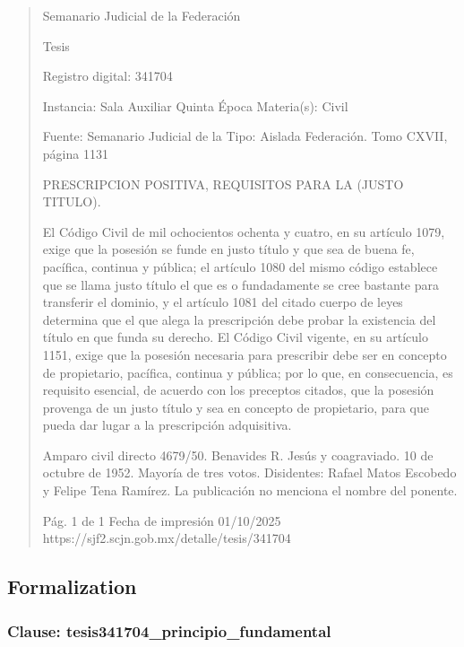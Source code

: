\documentclass[11pt,a4paper]{article}
\begin{document}
\begin{quote}
                                                   Semanario Judicial de la Federación

                                                  Tesis

 Registro digital: 341704

 Instancia: Sala Auxiliar         Quinta Época                         Materia(s): Civil

                                  Fuente: Semanario Judicial de la     Tipo: Aislada
                                  Federación.
                                  Tomo CXVII, página 1131


PRESCRIPCION POSITIVA, REQUISITOS PARA LA (JUSTO TITULO).


El Código Civil de mil ochocientos ochenta y cuatro, en su artículo 1079, exige que la posesión se
funde en justo título y que sea de buena fe, pacífica, continua y pública; el artículo 1080 del mismo
código establece que se llama justo título el que es o fundadamente se cree bastante para transferir
el dominio, y el artículo 1081 del citado cuerpo de leyes determina que el que alega la prescripción
debe probar la existencia del título en que funda su derecho. El Código Civil vigente, en su artículo
1151, exige que la posesión necesaria para prescribir debe ser en concepto de propietario, pacífica,
continua y pública; por lo que, en consecuencia, es requisito esencial, de acuerdo con los preceptos
citados, que la posesión provenga de un justo título y sea en concepto de propietario, para que
pueda dar lugar a la prescripción adquisitiva.


Amparo civil directo 4679/50. Benavides R. Jesús y coagraviado. 10 de octubre de 1952. Mayoría
de tres votos. Disidentes: Rafael Matos Escobedo y Felipe Tena Ramírez. La publicación no
menciona el nombre del ponente.




                                             Pág. 1 de 1             Fecha de impresión 01/10/2025
  https://sjf2.scjn.gob.mx/detalle/tesis/341704

\end{quote}

\subsection{Formalization}

\subsubsection{Clause: tesis341704\_principio\_fundamental}
\end{document}
